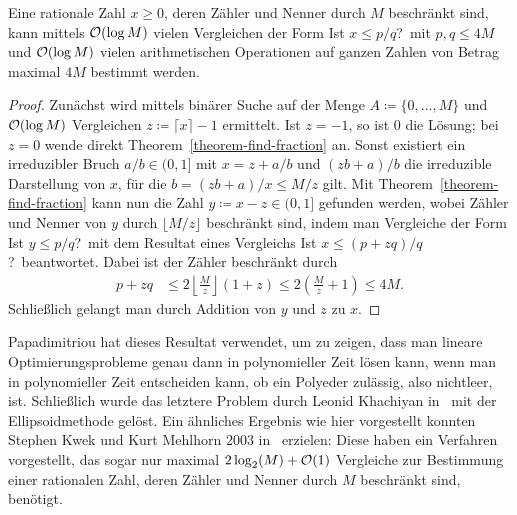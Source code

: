 \begin{theorem}\label{theorem-find-rational}
	Eine rationale Zahl $x\geq0$, deren Zähler und Nenner durch $M$ beschränkt sind, kann mittels $\mathcal{O}(\log M)$ vielen Vergleichen der Form \glqq Ist $x\leq p/q$?\grqq\ mit $p,q\leq 4M$ und $\mathcal{O}(\log M)$ vielen arithmetischen Operationen auf ganzen Zahlen von Betrag maximal $4M$ bestimmt werden.
\end{theorem}
\begin{proof}
	\newcommand{\highx}{\lceil x \rceil}
	Zunächst wird mittels binärer Suche auf der Menge $A\coloneq \{0,\dots, M\}$ und $\mathcal{O}(\log M)$ Vergleichen $z\coloneq \highx - 1$ ermittelt.
	Ist $z=-1$, so ist $0$ die Lösung; bei $z=0$ wende direkt Theorem~\ref{theorem-find-fraction} an.
	Sonst existiert ein irreduzibler Bruch $a/b\in(0,1]$ mit $x=z + a/b$ und $(z b + a)/b$ die irreduzible Darstellung von $x$, für die $b = (z b + a)/x \leq M/z$ gilt.
	Mit Theorem~\ref{theorem-find-fraction} kann nun die Zahl $y\coloneq x-z\in(0,1]$ gefunden werden, wobei Zähler und Nenner von $y$ durch $\lfloor M/z \rfloor$ beschränkt sind, indem man Vergleiche der Form \glqq Ist $y\leq p/q$?\grqq\ mit dem Resultat eines Vergleichs \glqq Ist $x\leq (p + zq)/q$?\grqq\ beantwortet.
	Dabei ist der Zähler beschränkt durch \begin{align*}
	p+z q &\leq 2 \left\lfloor \frac{M}{z} \right\rfloor (1+z) \leq 2 \left(\frac{M}{z} + 1\right)\leq 4M.
	\end{align*}
	Schließlich gelangt man durch Addition von $y$ und $z$ zu $x$.
\end{proof}

Papadimitriou hat dieses Resultat verwendet, um zu zeigen, dass man lineare Optimierungsprobleme genau dann in polynomieller Zeit lösen kann, wenn man in polynomieller Zeit entscheiden kann, ob ein Polyeder zulässig, also nichtleer, ist.
Schließlich wurde das letztere Problem durch Leonid Khachiyan in~\cite{Kha79} mit der Ellipsoidmethode gelöst.
Ein ähnliches Ergebnis wie hier vorgestellt konnten Stephen Kwek und Kurt Mehlhorn 2003 in~\cite{Kwek:2003} erzielen:
Diese haben ein Verfahren vorgestellt, das sogar nur maximal $2\log_2(M) + \mathcal{O}(1)$ Vergleiche zur Bestimmung einer rationalen Zahl, deren Zähler und Nenner durch $M$ beschränkt sind, benötigt.